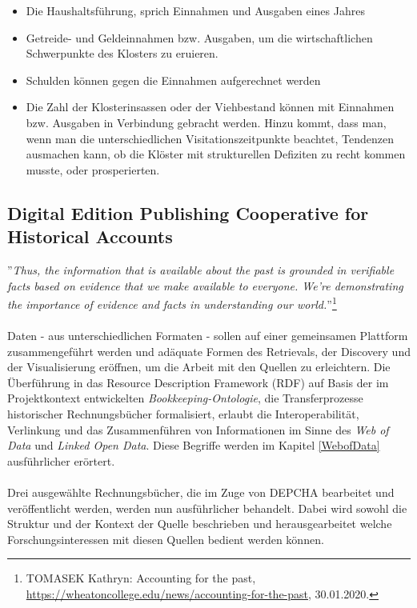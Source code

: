 \documentclass[12pt,a4paper]{article}
\begin{document}
\begin{itemize}
\item Die Haushaltsführung, sprich Einnahmen und Ausgaben eines Jahres 
\item Getreide- und Geldeinnahmen bzw. Ausgaben, um die wirtschaftlichen Schwerpunkte des Klosters zu eruieren.
\item Schulden können gegen die Einnahmen aufgerechnet werden 
\item Die Zahl der Klosterinsassen oder der Viehbestand können mit Einnahmen bzw. Ausgaben in Verbindung gebracht werden. Hinzu kommt, dass man, wenn man die unterschiedlichen Visitationszeitpunkte beachtet,
Tendenzen ausmachen kann, ob die Klöster mit strukturellen Defiziten zu recht kommen musste, oder prosperierten.
\end{itemize} 

\newpage
\subsection{Digital Edition Publishing Cooperative for Historical Accounts}
\label{DEPCHA}

''\textit{Thus, the information that is available about the past is grounded in verifiable facts based on evidence that we make available to everyone. We’re demonstrating the importance of evidence and facts in understanding our world.}''\footnote{TOMASEK Kathryn: Accounting for the past, \url{https://wheatoncollege.edu/news/accounting-for-the-past}, 30.01.2020.}
\\
\\
Daten - aus unterschiedlichen Formaten - sollen auf einer gemeinsamen Plattform zusammengeführt werden und adäquate Formen des Retrievals, der Discovery und der Visualisierung eröffnen, um die Arbeit mit den Quellen zu erleichtern. Die Überführung in das Resource Description Framework (RDF) auf Basis der im Projektkontext entwickelten \textit{Bookkeeping-Ontologie}, die Transferprozesse historischer Rechnungsbücher formalisiert, erlaubt die Interoperabilität, Verlinkung und das Zusammenführen von Informationen im Sinne des \textit{Web of Data} und \textit{Linked Open Data}. Diese Begriffe werden im Kapitel \ref{WebofData} ausführlicher erörtert.
\\
\\
Drei ausgewählte Rechnungsbücher, die im Zuge von DEPCHA bearbeitet und veröffentlicht werden, werden nun ausführlicher behandelt. Dabei wird sowohl die Struktur und der Kontext der Quelle beschrieben und herausgearbeitet welche Forschungsinteressen mit diesen Quellen bedient werden können. 
\end{document}
